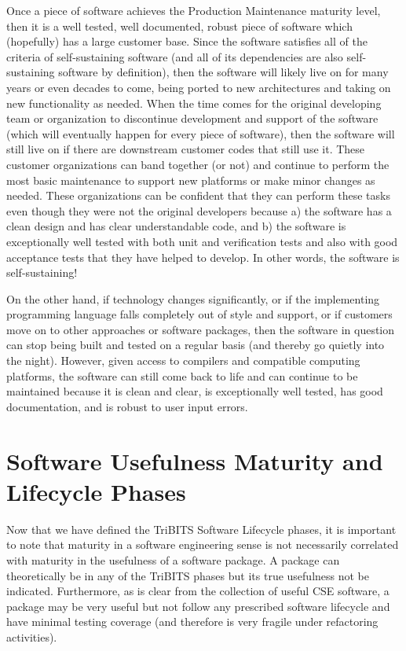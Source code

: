 \documentclass[11pt]{SANDreport}
\begin{document}
Once a piece of software achieves the Production Maintenance maturity level, then it is a well tested, well documented, robust piece of software which (hopefully) has a large customer base.  Since the software satisfies all of the criteria of self-sustaining software (and all of its dependencies are also self-sustaining software by definition), then the software will likely live on for many years or even decades to come, being ported to new architectures and taking on new functionality as needed.  When the time comes for the original developing team or organization to discontinue development and support of the software (which will eventually happen for every piece of software), then the software will still live on if there are downstream customer codes that still use it.  These customer organizations can band together (or not) and continue to perform the most basic maintenance to support new platforms or make minor changes as needed.  These organizations can be confident that they can perform these tasks even though they were not the original developers because a) the software has a clean design and has clear understandable code, and b) the software is exceptionally well tested with both unit and verification tests and also with good acceptance tests that they have helped to develop.  In other words, the software is self-sustaining!

On the other hand, if technology changes significantly, or if the implementing programming language falls completely out of style and support, or if customers move on to other approaches or software packages, then the software in question can stop being built and tested on a regular basis (and thereby go quietly into the night). However, given access to compilers and compatible computing platforms, the software can still come back to life and can continue to be maintained because it is clean and clear, is exceptionally well tested, has good documentation, and is robust to user input errors.


%
{}\section{Software Usefulness Maturity and Lifecycle Phases}
\label{sec:usefulness_maturity_lifecycle_phases}
%

Now that we have defined the TriBITS Software Lifecycle phases, it is important to note that maturity in a software engineering sense is not necessarily correlated with maturity in the usefulness of a software package.  A package can theoretically be in any of the TriBITS phases but its true usefulness not be indicated.  Furthermore, as is clear from the collection of useful CSE software, a package may be very useful but not follow any prescribed software lifecycle and have minimal testing coverage (and therefore is very fragile under refactoring activities).
\end{document}
